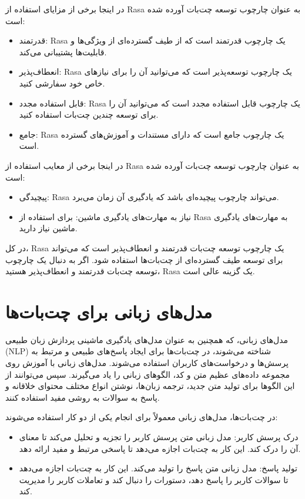 {در اینجا برخی از مزایای استفاده از Rasa به عنوان چارچوب توسعه چت‌بات آورده شده است:

\begin{itemize}
    \item قدرتمند: Rasa یک چارچوب قدرتمند است که از طیف گسترده‌ای از ویژگی‌ها و قابلیت‌ها پشتیبانی می‌کند.
    \item انعطاف‌پذیر: Rasa یک چارچوب توسعه‌پذیر است که می‌توانید آن را برای نیازهای خاص خود سفارشی کنید.
    \item قابل استفاده مجدد: Rasa یک چارچوب قابل استفاده مجدد است که می‌توانید آن را برای توسعه چندین چت‌بات استفاده کنید.
    \item جامع: Rasa یک چارچوب جامع است که دارای مستندات و آموزش‌های گسترده‌ است.
\end{itemize}

در اینجا برخی از معایب استفاده از Rasa به عنوان چارچوب توسعه چت‌بات آورده شده است:

\begin{itemize}
\item پیچیدگی: Rasa می‌تواند چارچوب پیچیده‌ای باشد که یادگیری آن زمان می‌برد.
\item نیاز به مهارت‌های یادگیری ماشین: برای استفاده از Rasa به مهارت‌های یادگیری ماشین نیاز دارید.
\end{itemize}

در کل، Rasa یک چارچوب توسعه چت‌بات قدرتمند و انعطاف‌پذیر است که می‌تواند برای توسعه طیف گسترده‌ای از چت‌بات‌ها استفاده شود. اگر به دنبال یک چارچوب توسعه چت‌بات قدرتمند و انعطاف‌پذیر هستید، Rasa یک گزینه عالی است.

\section{مدل‌های زبانی برای چت‌بات‌ها}

مدل‌های زبانی، که همچنین به عنوان مدل‌های یادگیری ماشینی پردازش زبان طبیعی (NLP) شناخته می‌شوند، در چت‌بات‌ها برای ایجاد پاسخ‌های طبیعی و مرتبط به پرسش‌ها و درخواست‌های کاربران استفاده می‌شوند. مدل‌های زبانی با آموزش روی مجموعه داده‌های عظیم متن و کد، الگوهای زبانی را یاد می‌گیرند. سپس می‌توانند از این الگوها برای تولید متن جدید، ترجمه زبان‌ها، نوشتن انواع مختلف محتوای خلاقانه و پاسخ به سوالات به روشی مفید استفاده کنند.

در چت‌بات‌ها، مدل‌های زبانی معمولاً برای انجام یکی از دو کار استفاده می‌شوند:

\begin{itemize}
    \item درک پرسش کاربر: مدل زبانی متن پرسش کاربر را تجزیه و تحلیل می‌کند تا معنای آن را درک کند. این کار به چت‌بات اجازه می‌دهد تا پاسخی مرتبط و مفید ارائه دهد.
    \item تولید پاسخ: مدل زبانی متن پاسخ را تولید می‌کند. این کار به چت‌بات اجازه می‌دهد تا سوالات کاربر را پاسخ دهد، دستورات را دنبال کند و تعاملات کاربر را مدیریت کند.
\end{itemize}

}
